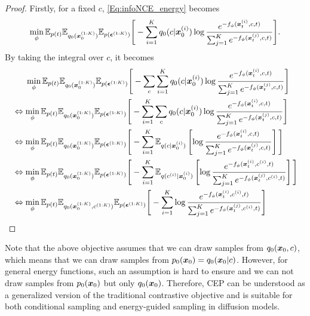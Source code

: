 \begin{proof}
Firstly, for a fixed $c$, \eqref{Eq:infoNCE_energy} becomes
\begin{equation*}
    \min_\phi \mathbb{E}_{p(t)}\mathbb{E}_{q_0({\bm{x}}_0^{(1:K)})}\mathbb{E}_{p(\bm{\epsilon}^{(1:K)})}\Bigg[ \\
    - \sum_{i=1}^K
    q_0(c|{\bm{x}}_0^{(i)})
    \log \frac{e^{-f_\phi({\bm{x}}_t^{(i)},c,t)}}{\sum_{j=1}^K e^{-f_\phi({\bm{x}}_t^{(j)},c,t)}}
\Bigg].
\end{equation*}
By taking the integral over $c$, it becomes
\begin{equation*}
\begin{split}
&\phantom{{}\Leftrightarrow{}}\min_\phi \E_{p(t)}\E_{q_0(\x_0^{(1:K)})}\E_{p(\epsilonv^{(1:K)})}\Bigg[
    - \sum_{c}\sum_{i=1}^K
    q_0(c|\x_0^{(i)})
    \log \frac{e^{-f_\phi(\x_t^{(i)},c,t)}}{\sum_{j=1}^K e^{-f_\phi(\x_t^{(j)},c,t)}}
\Bigg] \\
&\Leftrightarrow \min_\phi \E_{p(t)}\E_{q_0(\x_0^{(1:K)})}\E_{p(\epsilonv^{(1:K)})}\Bigg[
    - \sum_{i=1}^K\sum_{c}
    q_0(c|\x_0^{(i)})
    \log \frac{e^{-f_\phi(\x_t^{(i)},c,t)}}{\sum_{j=1}^K e^{-f_\phi(\x_t^{(j)},c,t)}}
\Bigg] \\
&\Leftrightarrow \min_\phi \E_{p(t)}\E_{q_0(\x_0^{(1:K)})}\E_{p(\epsilonv^{(1:K)})}\Bigg[
    - \sum_{i=1}^K \E_{q(c|\x_0^{(i)})} \left[
    \log \frac{e^{-f_\phi(\x_t^{(i)},c,t)}}{\sum_{j=1}^K e^{-f_\phi(\x_t^{(j)},c,t)}}
    \right]
\Bigg] \\
&\Leftrightarrow \min_\phi \E_{p(t)}\E_{q_0(\x_0^{(1:K)})}\E_{p(\epsilonv^{(1:K)})}\Bigg[
    - \sum_{i=1}^K \E_{q(c^{(i)}|\x_0^{(i)})} \left[
    \log \frac{e^{-f_\phi(\x_t^{(i)},c^{(i)},t)}}{\sum_{j=1}^K e^{-f_\phi(\x_t^{(j)},c^{(i)},t)}}
    \right]
\Bigg] \\
&\Leftrightarrow \min_\phi \E_{p(t)}\E_{q_0(\x_0^{(1:K)}, c^{(1:K)})}\E_{p(\epsilonv^{(1:K)})}\Bigg[
    - \sum_{i=1}^K
    \log \frac{e^{-f_\phi(\x_t^{(i)},c^{(i)},t)}}{\sum_{j=1}^K e^{-f_\phi(\x_t^{(j)},c^{(i)},t)}}
\Bigg]
\end{split}
\end{equation*}

\end{proof}

Note that the above objective assumes that we can draw samples from $q_0({\bm{x}}_0, c)$, which means that we can draw samples from $p_0({\bm{x}}_0)=q_0({\bm{x}}_0|c)$. However, for general energy functions, such an assumption is hard to ensure and we can not draw samples from $p_0({\bm{x}}_0)$ but only $q_0({\bm{x}}_0)$. Therefore, CEP can be understood as a generalized version of the traditional contrastive objective and is suitable for both conditional sampling and energy-guided sampling in diffusion models.



